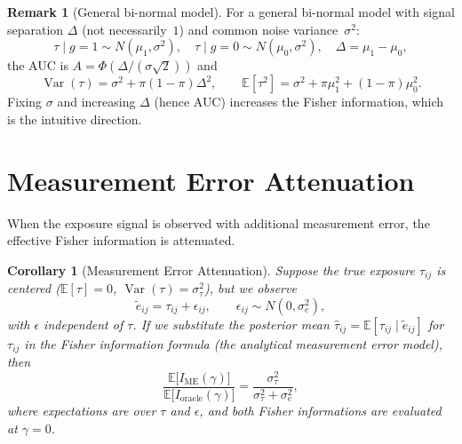 \documentclass[11pt,a4paper]{article}
\newtheorem{corollary}[theorem]{Corollary}
\theoremstyle{definition}
\newtheorem{remark}[theorem]{Remark}
\DeclareMathOperator{\Var}{Var}
\begin{document}
\begin{remark}[General bi-normal model]\label{rem:general_binormal}
For a general bi-normal model with signal separation $\Delta$
(not necessarily~$1$) and common noise variance~$\sigma^2$:
\[
  \tau\mid g{=}1 \sim N(\mu_1,\sigma^2),\quad
  \tau\mid g{=}0 \sim N(\mu_0,\sigma^2),\quad
  \Delta = \mu_1-\mu_0,
\]
the AUC is $A=\Phi(\Delta/(\sigma\sqrt{2}))$ and
\[
  \Var(\tau) = \sigma^2 + \pi(1{-}\pi)\Delta^2,
  \qquad
  \mathbb{E}[\tau^2] = \sigma^2 + \pi\mu_1^2 + (1{-}\pi)\mu_0^2.
\]
Fixing $\sigma$ and increasing $\Delta$ (hence AUC) increases the Fisher
information, which is the intuitive direction.
\end{remark}


\section{Measurement Error Attenuation}\label{sec:me}

When the exposure signal is observed with additional measurement error,
the effective Fisher information is attenuated.

\begin{corollary}[Measurement Error Attenuation]\label{cor:me}
Suppose the true exposure $\tau_{ij}$ is centered
($\mathbb{E}[\tau]=0$, $\Var(\tau)=\sigma_\tau^2$),
but we observe
\begin{equation}\label{eq:me_model}
  \tilde{e}_{ij} = \tau_{ij} + \epsilon_{ij},
  \qquad \epsilon_{ij}\sim N(0,\sigma_e^2),
\end{equation}
with $\epsilon$ independent of $\tau$.
If we substitute the posterior mean
$\hat{\tau}_{ij} = \mathbb{E}[\tau_{ij}\mid\tilde{e}_{ij}]$
for $\tau_{ij}$ in the Fisher information formula
(the analytical measurement error model), then
\begin{equation}\label{eq:me_ratio}
  \frac{\mathbb{E}\bigl[I_{\mathrm{ME}}(\gamma)\bigr]}
       {\mathbb{E}\bigl[I_{\mathrm{oracle}}(\gamma)\bigr]}
  = \frac{\sigma_\tau^2}{\sigma_\tau^2+\sigma_e^2},
\end{equation}
where expectations are over $\tau$ and $\epsilon$,
and both Fisher informations are evaluated at $\gamma=0$.
\end{corollary}
\end{document}
